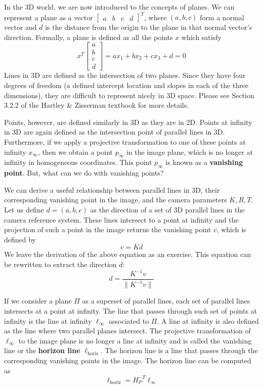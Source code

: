 \documentclass[a4paper, 12pt]{article}
\renewcommand\emph{\textbf}
\begin{document}
In the 3D world, we are now introduced to the concepts of planes. We can represent a plane as a vector $\begin{bmatrix}a&b&c&d\end{bmatrix} ^T$, where $(a,b,c)$ form a normal vector and $d$ is the distance from the origin to the plane in that normal vector's direction. Formally, a plane is defined as all the points $x$ which satisfy
\begin{equation}
x^T\begin{bmatrix}a\\b\\c\\d\end{bmatrix} = ax_1 + bx_2 + cx_3 + d = 0
\end{equation}
Lines in 3D are defined as the intersection of two planes. Since they have four degrees of freedom (a defined intercept location and slopes in each of the three dimensions), they are difficult to represent nicely in 3D space. Please see Section 3.2.2 of the Hartley \& Zisserman textbook for more details.

Points, however, are defined similarly in 3D as they are in 2D. Points at infinity in 3D are again defined as the intersection point of parallel lines in 3D. Furthermore, if we apply a projective transformation to one of these points at infinity $x_\infty$, then we obtain a point $p_\infty$ in the image plane, which is no longer at infinity in homogeneous coordinates. This point $p_\infty$ is known as a \emph{vanishing point}. But, what can we do with vanishing points?

We can derive a useful relationship between parallel lines in 3D, their corresponding vanishing point in the image, and the camera parameters $K,R,T$. Let us define $d = (a,b,c)$ as the direction of a set of 3D parallel lines in the camera reference system. These lines intersect to a point at infinity and the projection of such a point in the image returns the vanishing point $v$, which is defined by
\begin{equation}
v = Kd
\end{equation}
We leave the derivation of the above equation as an exercise. This equation can be rewritten to extract the direction $d$: 
\begin{equation}
d = \frac{K^{-1}v}{\|K^{-1}v\|}
\end{equation}

If we consider a plane $\Pi$ as a superset of parallel lines, each set of parallel lines intersects at a point at infinity. The line that passes through such set of points at infinity is the line at infinity $\ell_\infty$ associated to $\Pi$. A line at infinity is also defined as the line where two parallel planes intersect. The projective transformation of $\ell_\infty$ to the image plane is no longer a line at infinity and is called the vanishing line or the \emph{horizon line} $\ell_{\mathrm{horiz}}$. The horizon line is a line that passes through the corresponding vanishing points in the image. The horizon line can be computed as 
\begin{equation}
\ell_{\mathrm{horiz}} = H_P^{-T} \ell_\infty
\end{equation}
\end{document}
